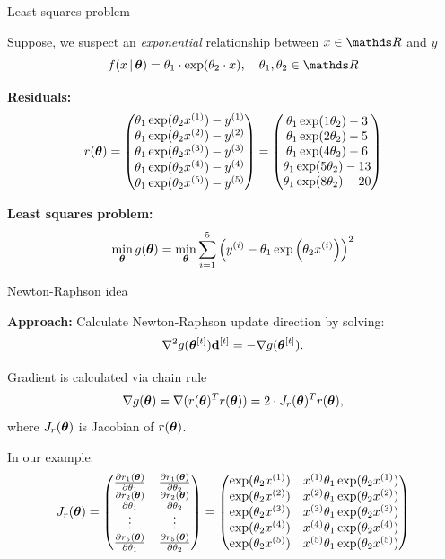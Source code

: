 \documentclass[11pt,compress,t,notes=noshow, xcolor=table]{beamer}
\begin{document}
\begin{framei}{Least squares problem}
\item Suppose, we suspect an \textit{exponential} relationship between $x \in \R$ and $y$
$$
f(x \,|\, \thetav) = \theta_1 \cdot \exp(\theta_2 \cdot x), \quad \theta_1, \theta_2 \in \R
$$
\item \textbf{Residuals:}
$$
r(\bm{\theta}) = \begin{pmatrix} 
\theta_1 \exp(\theta_2 x^{(1)}) - y^{(1)} \\
\theta_1 \exp(\theta_2 x^{(2)}) - y^{(2)} \\
\theta_1 \exp(\theta_2 x^{(3)}) - y^{(3)} \\
\theta_1 \exp(\theta_2 x^{(4)}) - y^{(4)} \\
\theta_1 \exp(\theta_2 x^{(5)}) - y^{(5)}
 \end{pmatrix} = \begin{pmatrix} 
\theta_1 \exp(1 \theta_2) - 3 \\
\theta_1 \exp(2 \theta_2) - 5 \\
\theta_1 \exp(4 \theta_2) - 6 \\
\theta_1 \exp(5 \theta_2) - 13 \\
\theta_1 \exp(8 \theta_2) - 20
 \end{pmatrix}
$$
\item \textbf{Least squares problem:}
$$
\min_{\bm{\theta}} g(\bm{\theta}) = \min_{\bm{\theta}} \sum_{i=1}^5 \left(y^{(i)} - \theta_1 \exp\left(\theta_2 x^{(i)}\right)\right)^2
$$
\end{framei}


\begin{framei}{Newton-Raphson idea}
\item \textbf{Approach:} Calculate Newton-Raphson update direction by solving:
$$
\nabla^2 g(\bm{\theta}^{[t]}) \mathbf{d}^{[t]} = - \nabla g(\bm{\theta}^{[t]}).
$$
\item Gradient is calculated via chain rule
$$
\nabla g(\bm{\theta}) = \nabla (r(\bm{\theta})^T r(\bm{\theta})) = 2 \cdot J_r(\bm{\theta})^T r(\bm{\theta}),
$$
where $J_r(\bm{\theta})$ is Jacobian of $r(\bm{\theta})$.
\item In our example:
$$
J_r(\bm{\theta}) = \begin{pmatrix} 
\frac{\partial r_1(\bm{\theta})}{\partial \theta_1} & \frac{\partial r_1(\bm{\theta})}{\partial \theta_2} \\
\frac{\partial r_2(\bm{\theta})}{\partial \theta_1} & \frac{\partial r_2(\bm{\theta})}{\partial \theta_2} \\
\vdots & \vdots \\
\frac{\partial r_5(\bm{\theta})}{\partial \theta_1} & \frac{\partial r_5(\bm{\theta})}{\partial \theta_2}
 \end{pmatrix} = \begin{pmatrix} 
\exp(\theta_2 x^{(1)}) & x^{(1)} \theta_1 \exp(\theta_2 x^{(1)}) \\
\exp(\theta_2 x^{(2)}) & x^{(2)} \theta_1 \exp(\theta_2 x^{(2)})\\ \exp(\theta_2 x^{(3)}) & x^{(3)} \theta_1 \exp(\theta_2 x^{(3)}) \\
\exp(\theta_2 x^{(4)}) & x^{(4)} \theta_1 \exp(\theta_2 x^{(4)}) \\ \exp(\theta_2 x^{(5)}) & x^{(5)} \theta_1 \exp(\theta_2 x^{(5)})
 \end{pmatrix}
$$
\end{framei}
\end{document}
